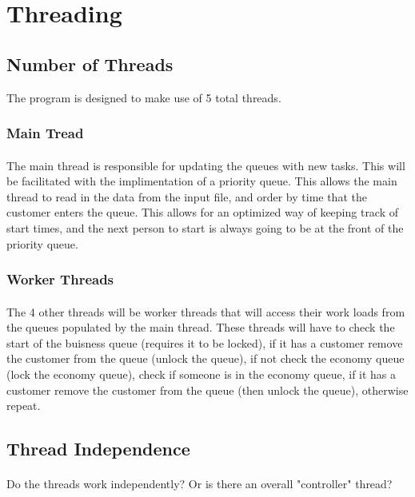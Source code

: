 \documentclass[12pt, letterpaper]{article}
\begin{document}
\section{Threading}

\subsection{Number of Threads}

The program is designed to make use of 5 total threads.

\subsubsection{Main Tread}
\paragraph{}
The main thread is responsible for updating the queues with new tasks. This will be facilitated with the implimentation of a priority queue. This allows the main thread to read in the data from the input file, and order by time that the customer enters the queue. This allows for an optimized way of keeping track of start times, and the next person to start is always going to be at the front of the priority queue.

\subsubsection{Worker Threads}
\paragraph{}
The 4 other threads will be worker threads that will access their work loads from the queues populated by the main thread. These threads will have to check the start of the buisness queue (requires it to be locked), if it has a customer remove the customer from the queue (unlock the queue), if not check the economy queue (lock the economy queue), check if someone is in the economy queue, if it has a customer remove the customer from the queue (then unlock the queue), otherwise repeat.


\subsection{Thread Independence}
\paragraph{}
Do the threads work independently? Or is there an overall "controller" thread?
\end{document}

